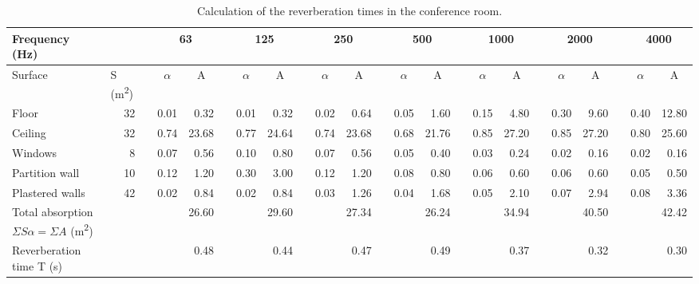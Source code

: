 \begin{sidewaystable}[htbp]
	\caption{Calculation of the reverberation times in the conference room.}
	\label{tbl:reverb_conf}
	\centering
	\begin{tabular}{@{}m{3cm}rrrrrrrrrrrrrrrrrrrrrr@{}}
		\toprule
		Frequency (Hz) & \multicolumn{1}{l}{} & \multicolumn{1}{c}{} & \multicolumn{2}{c}{63} & \multicolumn{1}{c}{} & \multicolumn{2}{c}{125} & \multicolumn{1}{c}{} & \multicolumn{2}{c}{250} & \multicolumn{1}{c}{} & \multicolumn{2}{c}{500} & \multicolumn{1}{c}{} & \multicolumn{2}{c}{1000} & \multicolumn{1}{c}{} & \multicolumn{2}{c}{2000} & \multicolumn{1}{c}{} & \multicolumn{2}{c}{4000} \\ \midrule
		Surface & \multicolumn{1}{l}{S (m\textsuperscript{2})} & \multicolumn{1}{l}{} & \multicolumn{1}{c}{$\alpha$} & \multicolumn{1}{c}{A} & \multicolumn{1}{c}{} & \multicolumn{1}{c}{$\alpha$} & \multicolumn{1}{c}{A} & \multicolumn{1}{c}{} & \multicolumn{1}{c}{$\alpha$} & \multicolumn{1}{c}{A} & \multicolumn{1}{c}{} & \multicolumn{1}{c}{$\alpha$} & \multicolumn{1}{c}{A} & \multicolumn{1}{c}{} & \multicolumn{1}{c}{$\alpha$} & \multicolumn{1}{c}{A} & \multicolumn{1}{c}{} & \multicolumn{1}{c}{$\alpha$} & \multicolumn{1}{c}{A} & \multicolumn{1}{c}{} & \multicolumn{1}{c}{$\alpha$} & \multicolumn{1}{c}{A} \\
		Floor & 32 &  & 0.01 & 0.32 &  & 0.01 & 0.32 &  & 0.02 & 0.64 &  & 0.05 & 1.60 &  & 0.15 & 4.80 &  & 0.30 & 9.60 &  & 0.40 & 12.80 \\
		Ceiling & 32 &  & 0.74 & 23.68 &  & 0.77 & 24.64 &  & 0.74 & 23.68 &  & 0.68 & 21.76 &  & 0.85 & 27.20 &  & 0.85 & 27.20 &  & 0.80 & 25.60 \\
		Windows & 8 &  & 0.07 & 0.56 &  & 0.10 & 0.80 &  & 0.07 & 0.56 &  & 0.05 & 0.40 &  & 0.03 & 0.24 &  & 0.02 & 0.16 &  & 0.02 & 0.16 \\
		Partition wall & 10 &  & 0.12 & 1.20 &  & 0.30 & 3.00 &  & 0.12 & 1.20 &  & 0.08 & 0.80 &  & 0.06 & 0.60 &  & 0.06 & 0.60 &  & 0.05 & 0.50 \\
		Plastered walls & 42 &  & 0.02 & 0.84 &  & 0.02 & 0.84 &  & 0.03 & 1.26 &  & 0.04 & 1.68 &  & 0.05 & 2.10 &  & 0.07 & 2.94 &  & 0.08 & 3.36 \\ \midrule
		Total absorption $\Sigma S \alpha = \Sigma A$ (m\textsuperscript{2}) &  &  &  & 26.60 &  &  & 29.60 &  &  & 27.34 &  &  & 26.24 &  &  & 34.94 &  &  & 40.50 &  &  & 42.42 \\
		Reverberation time T (s) &  &  &  & 0.48 &  &  & 0.44 &  &  & 0.47 &  &  & 0.49 &  &  & 0.37 &  &  & 0.32 &  &  & 0.30 \\ \bottomrule
	\end{tabular}
\end{sidewaystable}